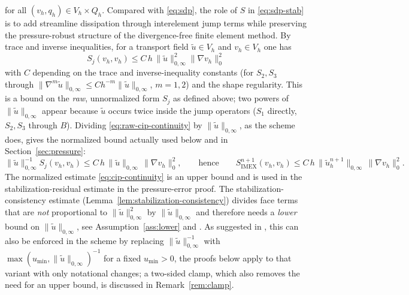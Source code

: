 \documentclass[11pt]{article}
\theoremstyle{remark}\newtheorem{remark}{Remark}
\newcommand{\Vh}{V_h}\newcommand{\Qh}{Q_h}
\newcommand{\tu}{\tilde u_h}
\newcommand{\Simex}{S_{\mathrm{IMEX}}}
\theoremstyle{plain}
\newcommand{\new}[1]{{\color{blue}#1}}
\begin{document}
for all $(v_h,q_h)\in\Vh\times\Qh$. Compared with \eqref{eq:sdp}, the role of $S$ in \eqref{eq:sdp-stab} is to add streamline dissipation through interelement jump terms while preserving the pressure-robust structure of the divergence-free finite element method.
By trace and inverse inequalities, for a transport field $\tilde u\in\Vh$ and $v_h\in\Vh$ one has
\begin{equation}\label{eq:raw-cip-continuity}
S_j(v_h,v_h)\le C\,h\,\|\tilde u\|_{0,\infty}^2\|\nabla v_h\|_0^2
\end{equation}
with $C$ depending on the trace and inverse-inequality constants (for $S_2,S_3$ through $\|\nabla^m\tilde u\|_{0,\infty}\le Ch^{-m}\|\tilde u\|_{0,\infty}$, $m=1,2$) and the shape regularity. This is a bound on the \emph{raw}, unnormalized form $S_j$ as defined above; two powers of $\|\tilde u\|_{0,\infty}$ appear because $\tilde u$ occurs twice inside the jump operators ($S_1$ directly, $S_2,S_3$ through $B$). Dividing \eqref{eq:raw-cip-continuity} by $\|\tilde u\|_{0,\infty}$, as the scheme does, gives the normalized bound actually used below and in Section~\ref{sec:pressure}:
\begin{equation}\label{eq:cip-continuity}
\|\tilde u\|_{0,\infty}^{-1}S_j(v_h,v_h)\le C\,h\,\|\tilde u\|_{0,\infty}\,\|\nabla v_h\|_0^2,
\qquad\text{hence}\qquad
\Simex^{n+1}(v_h,v_h)\le C\,h\,\|\tu^{n+1}\|_{0,\infty}\,\|\nabla v_h\|_0^2.
\end{equation}
The normalized estimate \eqref{eq:cip-continuity} is an upper bound and is used in the stabilization-residual estimate in the pressure-error proof.
The stabilization-consistency estimate (Lemma~\ref{lem:stabilization-consistency}) divides face terms that are \emph{not} proportional to $\|\tilde u\|_{0,\infty}^2$ by $\|\tilde u\|_{0,\infty}$ and therefore needs a \emph{lower} bound on $\|\tilde u\|_{0,\infty}$, see Assumption~\ref{ass:lower} and \cite[(48)]{GAN25}. As suggested in \cite[Remark~3.4]{GAN25}, this can also be enforced in the scheme by replacing $\|\tilde u\|_{0,\infty}^{-1}$ with $\max(u_{\min},\|\tilde u\|_{0,\infty})^{-1}$ for a fixed $u_{\min}>0$, the proofs below apply to that variant with only notational changes\new{; a two-sided clamp, which also removes the need for an upper bound, is discussed in Remark~\ref{rem:clamp}}.

\end{document}
